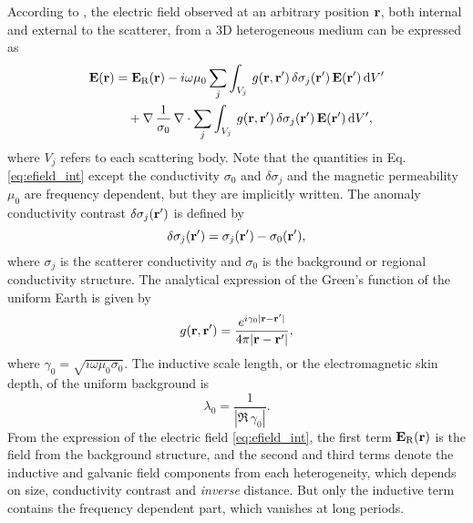 		According to \citet{hohmann1975a}, the electric field observed at an arbitrary position $\mathbf{r}$, both internal and external to the scatterer, from a 3D heterogeneous medium can be expressed as
			\begin{equation} \label{eq:efield_int}
				\begin{split}
					\Ebf\fxr & = \Ebf_\Regional\fxr - i\omega\mu_0\sum_j\int_{V_j}  \,g(\rbf,\rbf')\,\delta\sigma_j(\rbf')\, \Ebf(\rbf') \, \dwrt V' \\
					& \quad + \nabla\, \frac{1}{\sigma_0}\, \div{\sum_j \int_{V_j} \,g(\rbf,\rbf')\,\delta\sigma_j(\rbf')\, \Ebf(\rbf') \, \dwrt V' },
				\end{split}
			\end{equation}
			where $V_j$ refers to each scattering body.
			Note that the quantities in Eq. \eqref{eq:efield_int} except the conductivity $\sigma_0$ and $\delta\sigma_j$ and the magnetic permeability $\mu_0$ are frequency dependent, but they are implicitly written.
			The anomaly conductivity contrast $\delta \sigma_j(\mathbf{r}')$ is defined by
			\begin{equation} \delta \sigma_j(\mathbf{r}') = \sigma_j(\mathbf{r}') - \sigma_0(\mathbf{r}'), 
			\end{equation}
			where $\sigma_j$ is the scatterer conductivity and $\sigma_0$  is the background or regional conductivity structure.
			The analytical expression of the Green's function of the uniform Earth is given by
			\begin{equation}
				g(\mathbf{r},\mathbf{r}') = \frac{e^{i\gamma_0 |\mathbf{r}-\mathbf{r}'|}}{4\pi|\mathbf{r}-\mathbf{r}'|},
			\end{equation}
			where $\gamma_0=\sqrt{i\omega\mu_0\sigma_0}$. The inductive scale length, or the electromagnetic skin depth, of the uniform background is 
			\begin{equation}\label{eq:idl_background}
				\lambda_0 = \frac{1}{|\Re\,\gamma_0|}.
			\end{equation}
			From the expression of the electric field \eqref{eq:efield_int}, the first term $\mathbf{E}_{\text{R}}(\mathbf{r})$ is the field from the background structure, and the second and third terms denote the inductive and galvanic field components from each heterogeneity, which depends on size, conductivity contrast and \emph{inverse} distance.			
			But only the inductive term contains the frequency dependent part, which vanishes at long periods. 
			
